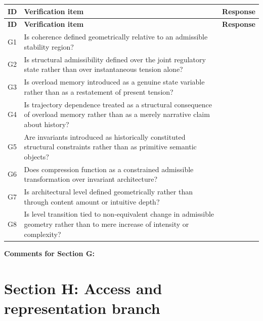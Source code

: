 \documentclass[11pt,a4paper]{article}
\begin{document}
	\begin{longtable}{>{\RaggedRight\arraybackslash}p{}
			>{\RaggedRight\arraybackslash}p{}
			>{\RaggedRight\arraybackslash}p{}}
		\toprule
		\textbf{ID} & \textbf{Verification item} & \textbf{Response} \\
		\midrule
		\endfirsthead
		\toprule
		\textbf{ID} & \textbf{Verification item} & \textbf{Response} \\
		\midrule
		\endhead
		
		G1 & Is coherence defined geometrically relative to an admissible stability region? & \\
		
		G2 & Is structural admissibility defined over the joint regulatory state rather than over instantaneous tension alone? & \\
		
		G3 & Is overload memory introduced as a genuine state variable rather than as a restatement of present tension? & \\
		
		G4 & Is trajectory dependence treated as a structural consequence of overload memory rather than as a merely narrative claim about history? & \\
		
		G5 & Are invariants introduced as historically constituted structural constraints rather than as primitive semantic objects? & \\
		
		G6 & Does compression function as a constrained admissible transformation over invariant architecture? & \\
		
		G7 & Is architectural level defined geometrically rather than through content amount or intuitive depth? & \\
		
		G8 & Is level transition tied to non-equivalent change in admissible geometry rather than to mere increase of intensity or complexity? & \\
		
		\bottomrule
	\end{longtable}
	
	\textbf{Comments for Section G:}
	
	\vspace{3em}
	
	\section{Section H: Access and representation branch}
	
\end{document}
